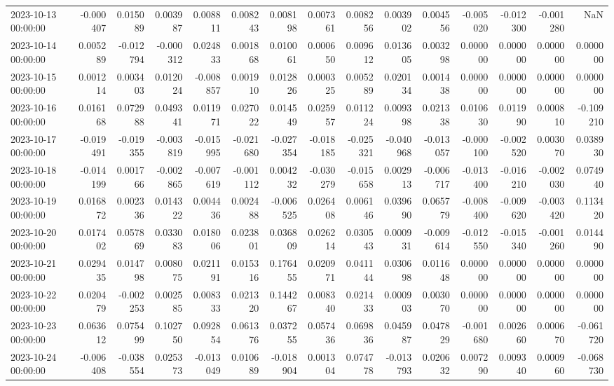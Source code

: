 \begin{tabular}{lrrrrrrrrrrrrrr}
2023-10-13 00:00:00 & -0.000407 & 0.015089 & 0.003987 & 0.008811 & 0.008243 & 0.008198 & 0.007361 & 0.008256 & 0.003902 & 0.004556 & -0.005020 & -0.012300 & -0.001280 & NaN \\
2023-10-14 00:00:00 & 0.005289 & -0.012794 & -0.000312 & 0.024833 & 0.001868 & 0.010061 & 0.000650 & 0.009612 & 0.013605 & 0.003298 & 0.000000 & 0.000000 & 0.000000 & 0.000000 \\
2023-10-15 00:00:00 & 0.001214 & 0.003403 & 0.012024 & -0.008857 & 0.001910 & 0.012826 & 0.000325 & 0.005289 & 0.020134 & 0.001438 & 0.000000 & 0.000000 & 0.000000 & 0.000000 \\
2023-10-16 00:00:00 & 0.016168 & 0.072988 & 0.049341 & 0.011971 & 0.027022 & 0.014549 & 0.025957 & 0.011224 & 0.009398 & 0.021338 & 0.010630 & 0.011990 & 0.000810 & -0.109210 \\
2023-10-17 00:00:00 & -0.019491 & -0.019355 & -0.003819 & -0.015995 & -0.021680 & -0.027354 & -0.018185 & -0.025321 & -0.040968 & -0.013057 & -0.000100 & -0.002520 & 0.003070 & 0.038930 \\
2023-10-18 00:00:00 & -0.014199 & 0.001766 & -0.002865 & -0.007619 & -0.001112 & 0.004232 & -0.030279 & -0.015658 & 0.002913 & -0.006717 & -0.013400 & -0.016210 & -0.002030 & 0.074940 \\
2023-10-19 00:00:00 & 0.016872 & 0.002336 & 0.014322 & 0.004436 & 0.002488 & -0.006525 & 0.026408 & 0.006146 & 0.039690 & 0.065779 & -0.008400 & -0.009620 & -0.003420 & 0.113420 \\
2023-10-20 00:00:00 & 0.017402 & 0.057869 & 0.033083 & 0.018006 & 0.023801 & 0.036809 & 0.026214 & 0.030543 & 0.000931 & -0.009614 & -0.012550 & -0.015340 & -0.001260 & 0.014490 \\
2023-10-21 00:00:00 & 0.029435 & 0.014798 & 0.008075 & 0.021191 & 0.015316 & 0.176455 & 0.020971 & 0.041144 & 0.030698 & 0.011648 & 0.000000 & 0.000000 & 0.000000 & 0.000000 \\
2023-10-22 00:00:00 & 0.020479 & -0.002253 & 0.002585 & 0.008333 & 0.021320 & 0.144267 & 0.008340 & 0.021433 & 0.000903 & 0.003070 & 0.000000 & 0.000000 & 0.000000 & 0.000000 \\
2023-10-23 00:00:00 & 0.063612 & 0.075499 & 0.102750 & 0.092854 & 0.061376 & 0.037255 & 0.057436 & 0.069836 & 0.045987 & 0.047829 & -0.001680 & 0.002660 & 0.000670 & -0.061720 \\
2023-10-24 00:00:00 & -0.006408 & -0.038554 & 0.025373 & -0.013049 & 0.010689 & -0.018904 & 0.001304 & 0.074778 & -0.013793 & 0.020632 & 0.007290 & 0.009340 & 0.000960 & -0.068730 \\

\end{tabular}
